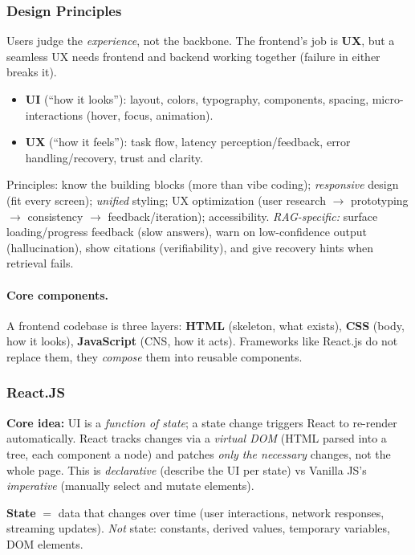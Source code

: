 \documentclass{article}
\begin{document}
\subsubsection{Design Principles}
Users judge the \textit{experience}, not the backbone. The frontend's job is \textbf{UX}, but a seamless UX needs frontend and backend working together (failure in either breaks it).
\begin{itemize}
    \item \textbf{UI} (``how it looks''): layout, colors, typography, components, spacing, micro-interactions (hover, focus, animation).
    \item \textbf{UX} (``how it feels''): task flow, latency perception/feedback, error handling/recovery, trust and clarity.
\end{itemize}
\noindent Principles: know the building blocks (more than vibe coding); \textit{responsive} design (fit every screen); \textit{unified} styling; UX optimization (user research $\rightarrow$ prototyping $\rightarrow$ consistency $\rightarrow$ feedback/iteration); accessibility. \textit{RAG-specific:} surface loading/progress feedback (slow answers), warn on low-confidence output (hallucination), show citations (verifiability), and give recovery hints when retrieval fails.

\paragraph{Core components.} A frontend codebase is three layers: \textbf{HTML} (skeleton, what exists), \textbf{CSS} (body, how it looks), \textbf{JavaScript} (CNS, how it acts). Frameworks like React.js do not replace them, they \textit{compose} them into reusable components.

\subsubsection{React.JS}
\textbf{Core idea:} UI is a \textit{function of state}; a state change triggers React to re-render automatically. React tracks changes via a \textit{virtual DOM} (HTML parsed into a tree, each component a node) and patches \textit{only the necessary} changes, not the whole page. This is \textit{declarative} (describe the UI per state) vs Vanilla JS's \textit{imperative} (manually select and mutate elements).

\textbf{State} $=$ data that changes over time (user interactions, network responses, streaming updates). \textit{Not} state: constants, derived values, temporary variables, DOM elements.
\end{document}
